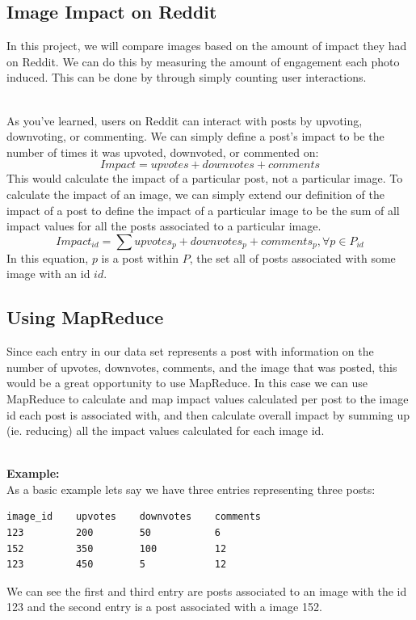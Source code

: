 \documentclass{article}
\begin{document}
\subsection*{Image Impact on Reddit}
In this project, we will compare images based on the amount of impact they had on Reddit. We can do this by measuring the amount of engagement each photo induced. This can be done by through simply counting user interactions. 

\-\ \\As you've learned, users on Reddit can interact with posts by upvoting, downvoting, or commenting. We can simply define a post's impact to be the number of times it was upvoted, downvoted, or commented on:
$$Impact = upvotes + downvotes + comments $$
This would calculate the impact of a particular post, not a particular image. To calculate the impact of an image, we can simply extend our definition of the impact of a post to define the impact of a particular image to be the sum of all impact values for all the posts associated to a particular image.
$$Impact_{id} = \sum upvotes_p + downvotes_p + comments_p, \forall p \in P_{id} $$
In this equation, $p$ is a post within $P$, the set all of posts associated with some image with an id $id$.


\subsection*{Using MapReduce}
Since each entry in our data set represents a post with information on the number of upvotes, downvotes, comments, and the image that was posted, this would be a great opportunity to use MapReduce. In this case we can use MapReduce to calculate and map impact values calculated per post to the image id each post is associated with, and then calculate overall impact by summing up (ie. reducing) all the impact values calculated for each image id.

\-\ \\\textbf{Example:}\\ 
As a basic example lets say we have three entries representing three posts: 
\begin{lstlisting}[language=bash]
image_id    upvotes    downvotes    comments
123         200        50           6
152         350        100          12
123         450        5            12
\end{lstlisting}
We can see the first and third entry are posts associated to an image with the id 123 and the second entry is a post associated with a image 152.
\end{document}
